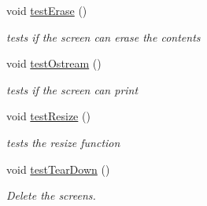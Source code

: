 \begin{DoxyCompactItemize}
void \hyperlink{classScreenTest_aaed44a62c633473d3e42eeeebeb1462e}{test\-Erase} ()
\begin{DoxyCompactList}\small\item\em tests if the screen can erase the contents \end{DoxyCompactList}\item 
void \hyperlink{classScreenTest_a76e435d849ee531b15ab281a0b784cc5}{test\-Ostream} ()
\begin{DoxyCompactList}\small\item\em tests if the screen can print \end{DoxyCompactList}\item 
void \hyperlink{classScreenTest_a44ced1845bd4e17e371a40f70202b3d5}{test\-Resize} ()
\begin{DoxyCompactList}\small\item\em tests the resize function \end{DoxyCompactList}\item 
void \hyperlink{classScreenTest_a307c0767825f1ce5e2beae8122ac28ff}{test\-Tear\-Down} ()
\begin{DoxyCompactList}\small\item\em Delete the screens. \end{DoxyCompactList}\end{DoxyCompactItemize}
